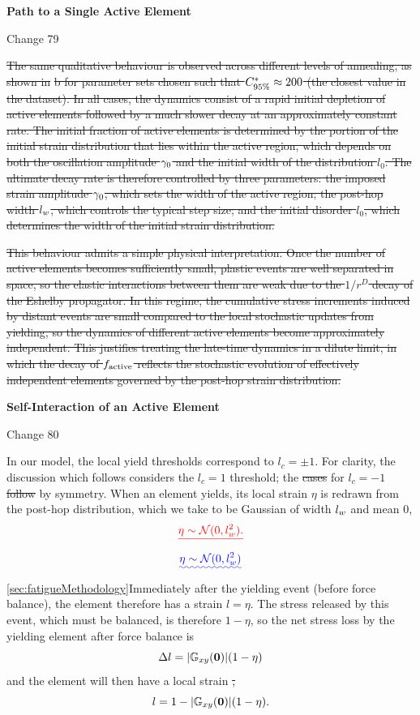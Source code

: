 \documentclass[asymmetricmargins]{library/duthesis}%
\newcommand{\DiffReportBodyFont}{\small}
\newcommand{\DiffReportLocationFont}{\large\bfseries}
\newcommand{\DiffReportMetaFont}{\small\ttfamily}
\newcommand{\DiffReportLocation}[1]{%
  \Needspace{4\baselineskip}%
  \par\medskip
  {\DiffReportLocationFont #1\par}
}
\newcommand{\DiffReportChange}[1]{%
  \Needspace{4\baselineskip}%
  \par\smallskip
  {\DiffReportMetaFont Change #1\par}
  \smallskip
}
\newenvironment{DiffReportContent}
  {\begingroup\DiffReportBodyFont}
  {\par\endgroup\medskip}
\providecommand{\DIFadd}[1]{{\protect\color{blue}\uwave{#1}}} %
\providecommand{\DIFdel}[1]{{\protect\color{red}\sout{#1}}}                      %
\providecommand{\DIFaddbegin}{} %
\providecommand{\DIFaddend}{} %
\providecommand{\DIFdelbegin}{} %
\providecommand{\DIFdelend}{} %
\begin{document}
\DiffReportLocation{Path to a Single Active Element}
\DiffReportChange{79}
\begin{DiffReportContent}
\DIFdelbegin \DIFdel{The same qualitative behaviour is observed across different levels of annealing, as shown in }%
\DIFdel{b for parameter sets chosen such that $C^\ast_{95\%} \approx 200$ (the closest value in the dataset). In all cases, the dynamics consist of a rapid initial depletion of active elements followed by a much slower decay at an approximately constant rate. The initial fraction of active elements is determined by the portion of the initial strain distribution that lies within the active region, which depends on both the oscillation amplitude $\gamma_0$ and the initial width of the distribution $l_0$. The ultimate decay rate is therefore controlled by three parameters: the imposed strain amplitude $\gamma_0$, which sets the width of the active region; the post-hop width $l_w$, which controls the typical step size; and the initial disorder $l_0$, which determines the width of the initial strain distribution.
}%

\DIFdel{This behaviour admits a simple physical interpretation. Once the number of active elements becomes sufficiently small, plastic events are well separated in space, so the elastic interactions between them are weak due to the $1/r^D$ decay of the Eshelby propagator. In this regime, the cumulative stress increments induced by distant events are small compared to the local stochastic updates from yielding, so the dynamics of different active elements become approximately independent. This justifies treating the late-time dynamics in a dilute limit, in which the decay of $f_{\mathrm{active}}$ reflects the stochastic evolution of effectively independent elements governed by the post-hop strain distribution.
}\DIFdelend \end{DiffReportContent}
\DiffReportLocation{Self-Interaction of an Active Element}
\DiffReportChange{80}
\begin{DiffReportContent}
In our model, the local yield thresholds correspond to $l_c=\pm 1$. For clarity, the discussion which follows considers the \DIFdelbegin \DIFdel{$l_c= 1$ }\DIFdelend \DIFaddbegin \DIFadd{$l_c=1$ }\DIFaddend threshold; the \DIFdelbegin \DIFdel{cases }\DIFdelend \DIFaddbegin \DIFadd{case }\DIFaddend for $l_c=-1$ \DIFdelbegin \DIFdel{follow }\DIFdelend \DIFaddbegin \DIFadd{follows }\DIFaddend by symmetry. When an element yields, its local strain $\eta$ is redrawn from the post-hop distribution, which we take to be Gaussian of width $l_w$ and mean $0$,
\DIFdelbegin \[
 \DIFdel{\eta \sim \mathcal{N}(0,\lw^2).
}\]%
\DIFdelend \DIFaddbegin \[
 \DIFadd{\eta \sim \mathcal{N}(0,\lw^2)
}\]\DIFaddend 
\DIFaddbegin \DIFadd{as disscussed in }\cref{sec:fatigueMethodology}\DIFadd{. }\DIFaddend Immediately after the yielding event (before force balance), the element therefore has a strain $l=\eta$. The stress released by this event, which must be balanced, is therefore $1-\eta$, so the net stress loss by the yielding element after force balance is
\[
\Delta l = |\mathbb{G}_{xy}(\bm{0})|(1-\eta)
\]
and the element will then have a local strain
\DIFdelbegin \DIFdel{,
}\DIFdelend \[
l = 1 - |\mathbb{G}_{xy}(\bm{0})|(1-\eta).
\]
\end{DiffReportContent}
\end{document}
